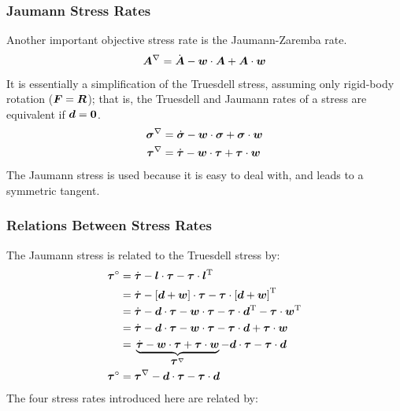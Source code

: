 \documentclass[10pt,letterpaper,oneside]{report}
\newcommand{\ten}[1]{\mbox{\boldmath $#1$}{}}
\newcommand{\scas}[1]{\mbox{{\scriptsize{${\rm{#1}}$}}}{}}
\begin{document}
\begin{itemize}
\subsubsection{Jaumann Stress Rates}
Another important objective stress rate is the \hypertarget{Jaumann}{Jaumann-Zaremba rate}.  
\begin{equation}
\ten{A}^{\nabla} = \dot{\ten{A}} - \ten{w} \cdot \ten{A} + \ten{A} \cdot \ten{w}
\end{equation}
It is essentially a simplification of the Truesdell stress, assuming only rigid-body rotation ($\ten{F} = \ten{R}$);  that is, the Truesdell and Jaumann rates of a stress are equivalent if $\ten{d} = \ten{0}$.  
\begin{align}
\ten{\sigma}^{\nabla} ={}& \dot{\ten{\sigma}} - \ten{w} \cdot  \ten{\sigma} +  \ten{\sigma} \cdot \ten{w}
\\
\ten{ \tau}^{\nabla} ={}& \dot{\ten{\tau}} - \ten{w} \cdot \ten{\tau} +  \ten{\tau} \cdot \ten{w} 
\end{align}
The Jaumann stress is used because it is easy to deal with, and leads to a symmetric tangent.  


\subsubsection{Relations Between Stress Rates}
The Jaumann stress is related to the Truesdell stress by: 
\begin{align}
\ten{ \tau}^{\circ} ={}& \dot{ \ten{\tau} } -  \ten{l} \cdot \ten{\tau} - \ten{\tau} \cdot \ten{l}^{\scas{T}} 
\\
={}& \dot{ \ten{\tau} } - \left[ \ten{d} + \ten{w} \right] \cdot \ten{\tau} - \ten{\tau} \cdot \left[ \ten{d} + \ten{w} \right]^{\scas{T}} 
\notag \\
={}& \dot{ \ten{\tau} } - \ten{d} \cdot \ten{\tau} - \ten{w} \cdot \ten{\tau} - \ten{\tau} \cdot \ten{d}^{\scas{T}} - \ten{\tau} \cdot \ten{w}^{\scas{T}} 
\notag \\
={}& \dot{ \ten{\tau} } - \ten{d} \cdot \ten{\tau} - \ten{w} \cdot \ten{\tau} - \ten{\tau} \cdot \ten{d} + \ten{\tau} \cdot \ten{w} 
\notag \\
={}& \underbrace{ \dot{ \ten{\tau} } - \ten{w} \cdot \ten{\tau} + \ten{\tau} \cdot \ten{w} }_{ \ten{ \tau}^{\nabla} } - \ten{d} \cdot \ten{\tau} - \ten{\tau} \cdot \ten{d}  
\notag \\
\ten{ \tau}^{\circ} ={}& \ten{ \tau}^{\nabla} - \ten{d} \cdot \ten{\tau} - \ten{\tau} \cdot \ten{d}  
\end{align}
 The four stress rates introduced here are related by: 


\end{itemize}
\end{document}
